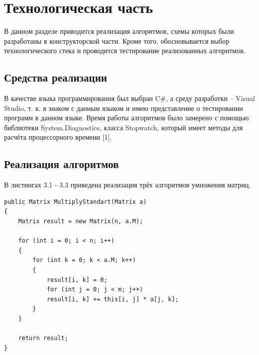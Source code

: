 \documentclass[12pt]{report}
\begin{document}
\newpage

\chapter{Технологическая часть}
В данном разделе приводится реализация алгоритмов, схемы которых были разработаны в конструкторской части. Кроме того, обосновывается выбор технологического стека и проводится тестирование реализованных алгоритмов.

\section{Средства реализации}

В качестве языка программирования был выбран C\#, а среду разработки -- Visual Studio, т. к. я знаком с данным языком и имею представление о тестировании программ в данном языке. Время работы алгоритмов было замерено с помощью библиотеки System.Diagnostics, класса Stopwatch, который имеет методы для расчёта процессорного времени [1].


\section{Реализация алгоритмов}

В листингах 3.1 - 3.3 приведена реализация трёх алгоритмов умножения матриц.

\begin{lstlisting}[label=base_code,caption=Функция обычного алгоритма умножения матриц]
public Matrix MultiplyStandart(Matrix a)
{
	Matrix result = new Matrix(n, a.M);
	
	for (int i = 0; i < n; i++)
	{
		for (int k = 0; k < a.M; k++)
		{
			result[i, k] = 0;
			for (int j = 0; j < m; j++)
			result[i, k] += this[i, j] * a[j, k];
		}
	}
	
	return result;
}
\end{lstlisting}
\end{document}
